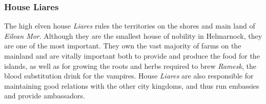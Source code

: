 \subsubsection*{House Liares}

The high elven house \emph{Liares} rules the territories on the shores and
main land of \emph{Eilean Mor}. Although they are the smallest house of
nobility in Helmarnock, they are one of the most important. They own the
vast majority of farms on the mainland and are vitally important both to
provide and produce the food for the islands, as well as for growing the
roots and herbs required to brew \emph{Ramesk}, the blood substitution drink
for the vampires. House \emph{Liares} are also responsible for maintaining
good relations with the other city kingdoms, and thus run embassies and
provide ambassadors.

